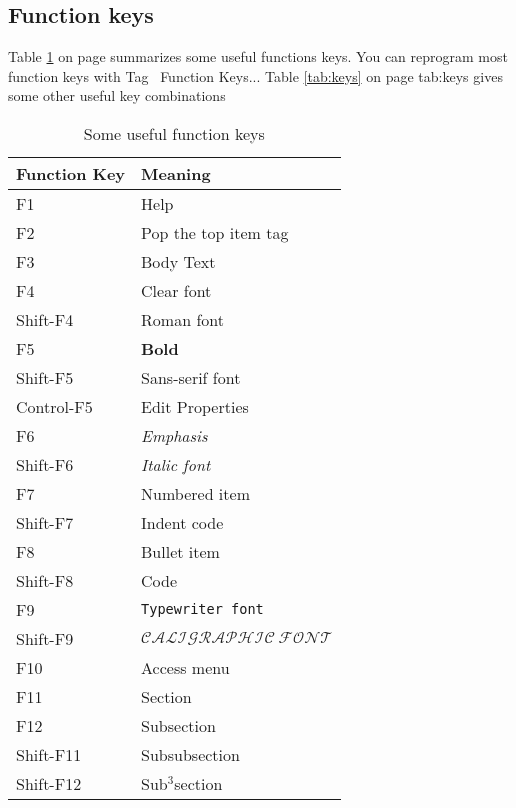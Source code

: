 \subsection{Function keys}

Table \ref{tab:fkeys} on page \pageref{tab:fkeys} summarizes some useful
functions keys. You can reprogram most function keys with Tag \TEXTsymbol{>}%
\TEXTsymbol{>}\ Function Keys... Table \ref{tab:keys} on page \pageref%
{tab:keys} gives some other useful key combinations

\begin{table}[tbp] \centering%
\begin{singlespaced}%
\begin{tabular}{|l|l|}
\hline\hline
\multicolumn{1}{||l|}{\textbf{Function Key}} & \multicolumn{1}{|l||}{\textbf{%
Meaning}} \\ \hline\hline
F1 & Help \\ \hline
F2 & Pop the top item tag \\ \hline
F3 & Body Text \\ \hline
F4 & Clear font \\ \hline
Shift-F4 & \textrm{Roman font} \\ \hline
F5 & \textbf{Bold} \\ \hline
Shift-F5 & \textsf{Sans-serif font} \\ \hline
Control-F5 & Edit Properties \\ \hline
F6 & \emph{Emphasis} \\ \hline
Shift-F6 & \textit{Italic font} \\ \hline
F7 & Numbered item \\ \hline
Shift-F7 & Indent code \\ \hline
F8 & Bullet item \\ \hline
Shift-F8 & Code \\ \hline
F9 & \texttt{Typewriter font} \\ \hline
Shift-F9 & $\mathcal{CALIGRAPHIC~FONT}$ \\ \hline
F10 & Access menu \\ \hline
F11 & Section \\ \hline
F12 & Subsection \\ \hline
Shift-F11 & Subsubsection \\ \hline
Shift-F12 & Sub$^{3}$section \\ \hline
\end{tabular}%
\end{singlespaced}%
\caption{Some useful function keys}\label{tab:fkeys}%
\end{table}%

